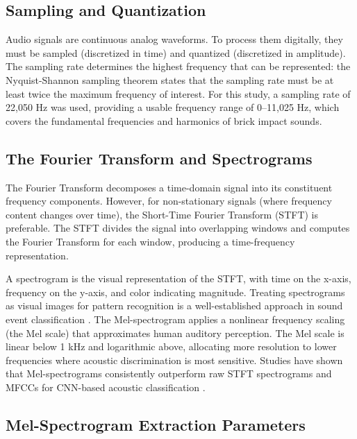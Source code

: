 \documentclass[12pt,a4paper,oneside]{report}
\begin{document}
\subsection{Sampling and Quantization}

Audio signals are continuous analog waveforms. To process them digitally, they must be sampled (discretized in time) and quantized (discretized in amplitude). The sampling rate determines the highest frequency that can be represented: the Nyquist-Shannon sampling theorem states that the sampling rate must be at least twice the maximum frequency of interest. For this study, a sampling rate of 22,050 Hz was used, providing a usable frequency range of 0--11,025 Hz, which covers the fundamental frequencies and harmonics of brick impact sounds.

\subsection{The Fourier Transform and Spectrograms}

The Fourier Transform decomposes a time-domain signal into its constituent frequency components. However, for non-stationary signals (where frequency content changes over time), the Short-Time Fourier Transform (STFT) is preferable. The STFT divides the signal into overlapping windows and computes the Fourier Transform for each window, producing a time-frequency representation.

A spectrogram is the visual representation of the STFT, with time on the x-axis, frequency on the y-axis, and color indicating magnitude. Treating spectrograms as visual images for pattern recognition is a well-established approach in sound event classification \cite{dennis2014}. The Mel-spectrogram applies a nonlinear frequency scaling (the Mel scale) that approximates human auditory perception. The Mel scale is linear below 1 kHz and logarithmic above, allocating more resolution to lower frequencies where acoustic discrimination is most sensitive. Studies have shown that Mel-spectrograms consistently outperform raw STFT spectrograms and MFCCs for CNN-based acoustic classification \cite{kim2025}.

\subsection{Mel-Spectrogram Extraction Parameters}
\end{document}

